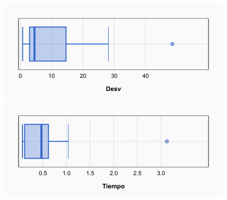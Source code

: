 \documentclass[a4paper, 12pt]{article}
\begin{document}
\begin{center}
         \includegraphics[scale=0.5]{boxplot-agepos-desv}
         \includegraphics[scale=0.5]{boxplot-agepos-time}
      \end{center}
      
      
      \newpage
\end{document}
